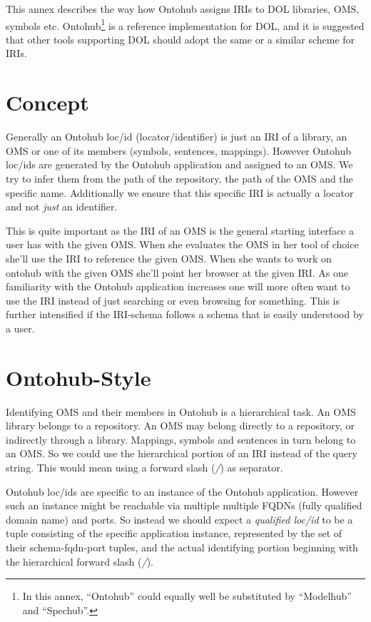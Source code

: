 \documentclass[10pt,fleqn,%
\ifpretendfinal
final%
\else
draft%
\fi,
]{scrreprt}
\begin{document}
This annex describes the way how Ontohub assigns IRIs to DOL
libraries, OMS, symbols etc. Ontohub\footnote{In this annex,
  ``Ontohub'' could equally well be substituted by ``Modelhub'' and
  ``Spechub''.} is a reference implementation for DOL, and it is
suggested that other tools supporting DOL should adopt the same or a
similar scheme for IRIs.


\section{Concept}

Generally an Ontohub loc/id (locator/identifier) is just an IRI of a
library, an OMS
or one of its members (symbols, sentences, mappings). However
Ontohub loc/ids are generated by the Ontohub application and assigned to an
OMS.  We try to infer them from the path of the repository, the path of
the OMS and the specific name. Additionally we ensure that this specific
IRI is actually a locator and not \emph{just} an identifier.

This is quite important as the IRI of an OMS is the general starting
interface a user has with the given OMS. When she evaluates the OMS
in her tool of choice she'll use the IRI to reference the given OMS. When
she wants to work on ontohub with the given OMS she'll point her browser
at the given IRI. As one familiarity with the Ontohub application increases one
will more often want to use the IRI instead of just searching or even browsing
for something.  This is further intensified if the IRI-schema follows a schema
that is easily understood by a user.

\section{Ontohub-Style}

Identifying OMS and their members in Ontohub is a hierarchical
task. An OMS library belongs to a repository. An OMS may belong
directly to a repository, or indirectly through a library. Mappings,
symbols and sentences in turn belong to an OMS. So we could use the
hierarchical portion of an IRI instead of the query string.  This
would mean using a forward slash (\emph{/}) as separator.

Ontohub loc/ids are specific to an instance of the Ontohub application. However
such an instance might be reachable via multiple multiple FQDNs (fully
qualified domain name) and ports. So instead we should expect a
\emph{qualified loc/id} to be a tuple consisting of the specific application
instance, represented by the set of their schema-fqdn-port tuples, and the
actual identifying portion beginning with the hierarchical forward slash
(\emph{/}).
\end{document}
